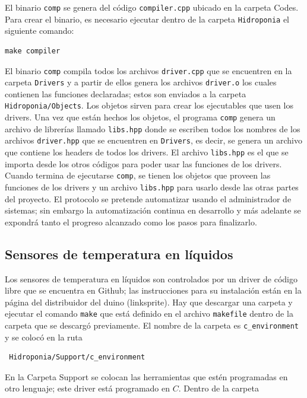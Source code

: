 \documentclass[10pt,twocolumn]{article}
\begin{document}
El binario \verb|comp| se genera del c\'odigo \verb|compiler.cpp| ubicado en la carpeta Codes. Para crear el binario, es necesario ejecutar dentro de la carpeta 
\verb|Hidroponia| el siguiente comando:

\begin{verbatim}
make compiler
\end{verbatim}

El binario \verb|comp| compila 
todos los archivos \verb|driver.cpp| que se encuentren en la carpeta \verb|Drivers| y a partir de ellos genera los archivos \verb|driver.o| los cuales contienen las 
funciones declaradas; estos 
son enviados a la carpeta \verb|Hidroponia/Objects|. Los objetos sirven para crear los ejecutables que usen los drivers. Una vez que est\'an hechos los 
objetos, el programa \verb|comp| genera un archivo de librer\'ias 
llamado \verb|libs.hpp| 
donde se escriben todos los nombres de los archivos \verb|driver.hpp| que se encuentren en \verb|Drivers|, es decir, se genera un archivo que contiene los headers de todos 
los drivers. El archivo 
\verb|libs.hpp| es el 
que se importa desde los otros c\'odigos para poder usar las funciones de los drivers. Cuando termina de ejecutarse \verb|comp|, se tienen los objetos que proveen las 
funciones de los drivers y un 
archivo \verb|libs.hpp| para usarlo desde las otras partes del proyecto. El protocolo se pretende automatizar usando el administrador de sistemas; sin embargo la 
automatizaci\'on continua en 
desarrollo y m\'as adelante se expondr\'a tanto el progreso alcanzado como los pasos para finalizarlo.

\subsection{Sensores de temperatura en l\'iquidos}
Los sensores de temperatura en l\'iquidos son controlados por un driver de 
c\'odigo libre que se encuentra en Github; las instrucciones para su 
instalaci\'on est\'an en la p\'agina del 
distribuidor del duino (linksprite). Hay que descargar una carpeta y 
ejecutar el comando \verb|make| que est\'a definido en el archivo \verb|makefile| dentro de la 
carpeta que se descarg\'o previamente. El nombre de la carpeta es \verb|c_environment| y se coloc\'o en la ruta

\begin{verbatim}
 Hidroponia/Support/c_environment
\end{verbatim}

En la Carpeta Support se colocan las herramientas que est\'en programadas en otro lenguaje; este driver est\'a programado en  
$C$. Dentro de la carpeta 
\end{document}
